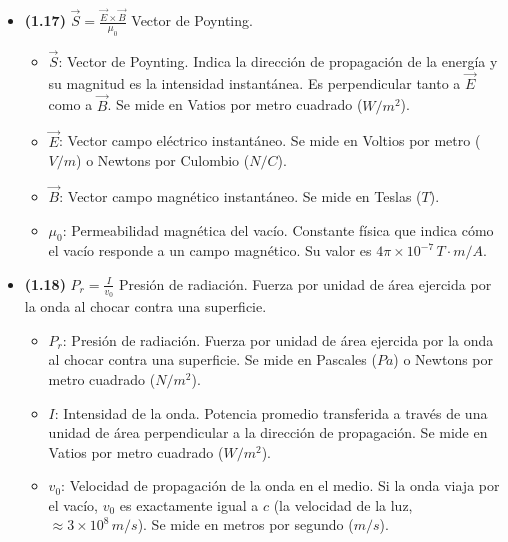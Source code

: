 \documentclass{article}
\begin{document}
\begin{itemize}
				\item \textbf{(1.17)} $\boxed{\vec{S}=\frac{\vec{E}\times\vec{B}}{\mu_{0}}}$ Vector de Poynting.
					\begin{itemize}
						\item $\vec{S}$: Vector de Poynting. Indica la dirección de propagación de la energía y su magnitud es la intensidad instantánea. Es perpendicular tanto a $\vec{E}$ como a $\vec{B}$. Se mide en Vatios por metro cuadrado ($W/m^2$).
						\item $\vec{E}$: Vector campo eléctrico instantáneo. Se mide en Voltios por metro ($V/m$) o Newtons por Culombio ($N/C$).
						\item $\vec{B}$: Vector campo magnético instantáneo. Se mide en Teslas ($T$).
						\item $\mu_0$: Permeabilidad magnética del vacío. Constante física que indica cómo el vacío responde a un campo magnético. Su valor es $4\pi \times 10^{-7} \, T\cdot m/A$.
					\end{itemize}

				\item \textbf{(1.18)} $\boxed{P_{r}=\frac{I}{v_{0}}}$ Presión de radiación. Fuerza por unidad de área ejercida por la onda al chocar contra una superficie.
					\begin{itemize}
						\item $P_r$: Presión de radiación. Fuerza por unidad de área ejercida por la onda al chocar contra una superficie. Se mide en Pascales ($Pa$) o Newtons por metro cuadrado ($N/m^2$).
						\item $I$: Intensidad de la onda. Potencia promedio transferida a través de una unidad de área perpendicular a la dirección de propagación. Se mide en Vatios por metro cuadrado ($W/m^2$).
						\item $v_0$: Velocidad de propagación de la onda en el medio. Si la onda viaja por el vacío, $v_0$ es exactamente igual a $c$ (la velocidad de la luz, $\approx 3 \times 10^8 \, m/s$). Se mide en metros por segundo ($m/s$).
					\end{itemize}
			\end{itemize}
\end{document}
